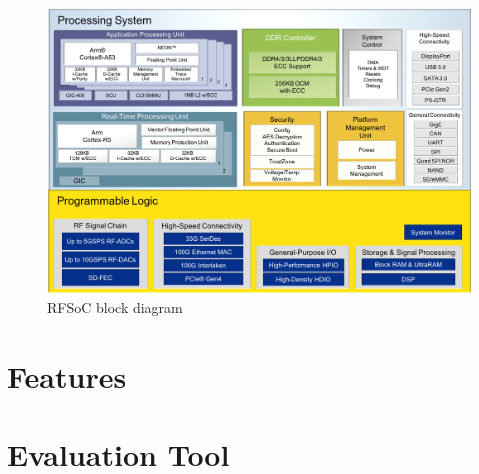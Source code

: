 \begin{figure}[tbh]
	\centering
	\includegraphics[width = \textwidth]{chap/04-work/img/rfsoc_blockdiagram}
	\caption{RFSoC block diagram}
	\label{fig:rfsoc}
\end{figure}

\section{Features}
\section{Evaluation Tool}